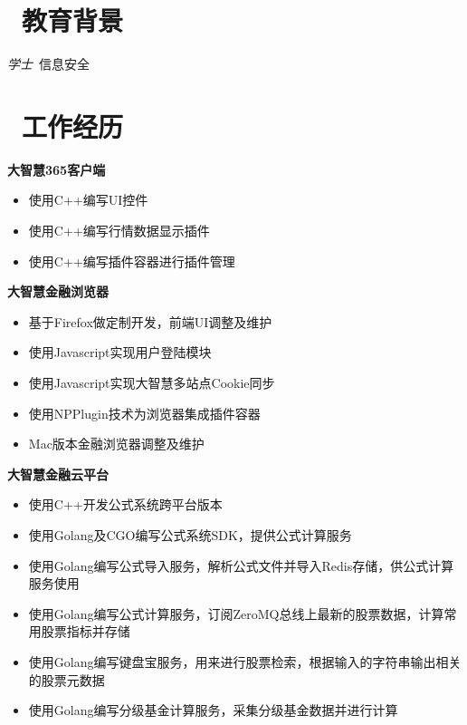 \documentclass{resume}
\begin{document}



\section{\faGraduationCap\ 教育背景}
\textit{学士}\ 信息安全

\section{\faUsers\ 工作经历}

\begin{onehalfspacing}
    \textbf{大智慧365客户端}
    \begin{itemize}
        \item 使用C++编写UI控件
        \item 使用C++编写行情数据显示插件
        \item 使用C++编写插件容器进行插件管理
    \end{itemize}
\end{onehalfspacing}

\begin{onehalfspacing}
    \textbf{大智慧金融浏览器}
    \begin{itemize}
        \item 基于Firefox做定制开发，前端UI调整及维护
        \item 使用Javascript实现用户登陆模块
        \item 使用Javascript实现大智慧多站点Cookie同步
        \item 使用NPPlugin技术为浏览器集成插件容器
        \item Mac版本金融浏览器调整及维护
    \end{itemize}
\end{onehalfspacing}

\begin{onehalfspacing}
    \textbf{大智慧金融云平台}
    \begin{itemize}
        \item 使用C++开发公式系统跨平台版本
        \item 使用Golang及CGO编写公式系统SDK，提供公式计算服务
        \item 使用Golang编写公式导入服务，解析公式文件并导入Redis存储，供公式计算服务使用
        \item 使用Golang编写公式计算服务，订阅ZeroMQ总线上最新的股票数据，计算常用股票指标并存储
        \item 使用Golang编写键盘宝服务，用来进行股票检索，根据输入的字符串输出相关的股票元数据
        \item 使用Golang编写分级基金计算服务，采集分级基金数据并进行计算
    \end{itemize}
\end{onehalfspacing}
\end{document}
